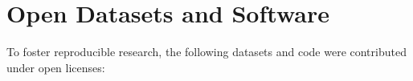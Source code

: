 \section*{Open Datasets and Software}
\label{sec:opendatasets}
To foster reproducible research, the following datasets and code were contributed under open licenses:
\begin{refsection}
\nocite{*}
\printbibliography[env=numbered+bold, heading=none,resetnumbers=true, sorting=ynt]
\newrefcontext[sorting=nyt]
\end{refsection}
